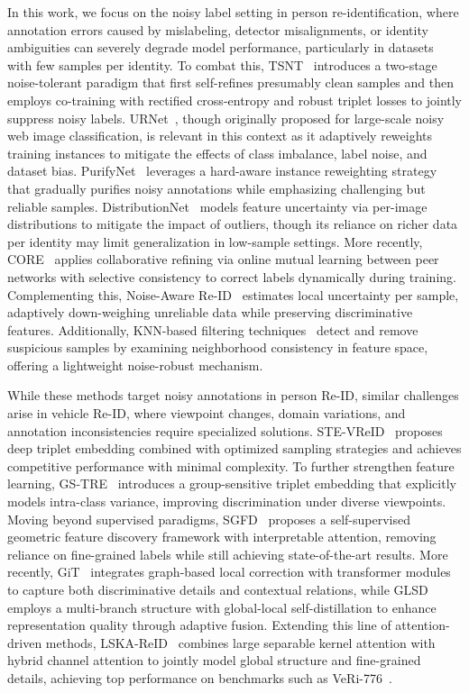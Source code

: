 \documentclass[lettersize,journal]{IEEEtran}
\begin{document}
In this work, we focus on the noisy label setting in person re-identification, where annotation errors caused by mislabeling, detector misalignments, or identity ambiguities can severely degrade model performance, particularly in datasets with few samples per identity. To combat this, TSNT~\cite{23} introduces a two-stage noise-tolerant paradigm that first self-refines presumably clean samples and then employs co-training with rectified cross-entropy and robust triplet losses to jointly suppress noisy labels. URNet~\cite{URNet}, though originally proposed for large-scale noisy web image classification, is relevant in this context as it adaptively reweights training instances to mitigate the effects of class imbalance, label noise, and dataset bias. PurifyNet~\cite{20} leverages a hard-aware instance reweighting strategy that gradually purifies noisy annotations while emphasizing challenging but reliable samples. DistributionNet~\cite{19} models feature uncertainty via per-image distributions to mitigate the impact of outliers, though its reliance on richer data per identity may limit generalization in low-sample settings. More recently, CORE~\cite{22} applies collaborative refining via online mutual learning between peer networks with selective consistency to correct labels dynamically during training. Complementing this, Noise-Aware Re-ID~\cite{21} estimates local uncertainty per sample, adaptively down-weighing unreliable data while preserving discriminative features. Additionally, KNN-based filtering techniques~\cite{galanakis2024noise} detect and remove suspicious samples by examining neighborhood consistency in feature space, offering a lightweight noise-robust mechanism.

While these methods target noisy annotations in person Re-ID, similar challenges arise in vehicle Re-ID, where viewpoint changes, domain variations, and annotation inconsistencies require specialized solutions. STE-VReID~\cite{34} proposes deep triplet embedding combined with optimized sampling strategies and achieves competitive performance with minimal complexity. To further strengthen feature learning, GS-TRE~\cite{31} introduces a group-sensitive triplet embedding that explicitly models intra-class variance, improving discrimination under diverse viewpoints. %
Moving beyond supervised paradigms, SGFD~\cite{33} proposes a self-supervised geometric feature discovery framework with interpretable attention, removing reliance on fine-grained labels while still achieving state-of-the-art results. More recently, GiT~\cite{git} integrates graph-based local correction with transformer modules to capture both discriminative details and contextual relations, while GLSD~\cite{GLSD} employs a multi-branch structure with global-local self-distillation to enhance representation quality through adaptive fusion. Extending this line of attention-driven methods, LSKA-ReID~\cite{LSKA-ReID} combines large separable kernel attention with hybrid channel attention to jointly model global structure and fine-grained details, achieving top performance on benchmarks such as VeRi-776~\cite{28}.
\end{document}
